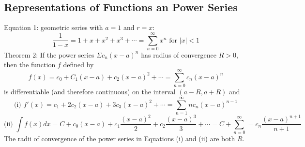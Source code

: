 \documentclass{article}
\begin{document}
    \subsection{Representations of Functions an Power Series}
    \begin{outline}
        \1 Equation 1: geometric series with \(a=1\) and \(r=x\): \[\dfrac{1}{1-x}=1+x+x^2+x^3+\cdots=\sum^\infty_{n=0}x^n\mbox{ for }|x|<1\]
        \1 Theorem 2: If the power series \(\Sigma c_n(x-a)^n\) has radius of convergence \(R>0\), then the function $f$ defined by \[f(x)=c_0+C_1(x-a)+c_2(x-a)^2+\cdots=\sum_{n=0}^\infty c_n(x-a)^n\] is differentiable (and therefore continuous) on the interval \((a-R, a+R)\) and \[\text{(i) }f'(x)=c_1+2c_2(x-a)+3c_3(x-a)^2+\cdots=\sum^\infty_{n=1}nc_n(x-a)^{n-1}\]\[\text{(ii) }\int f(x)dx=C+c_0(x-a)+c_1\dfrac{(x-a)^2}{2}+c_2\dfrac{(x-a)^3}{3}+\cdots=C+\sum^\infty_{n=0}=c_n\dfrac{(x-a)^{n+1}}{n+1}\] The radii of convergence of the power series in Equations (i) and (ii) are both $R$. 

    \end{outline}
\end{document}
